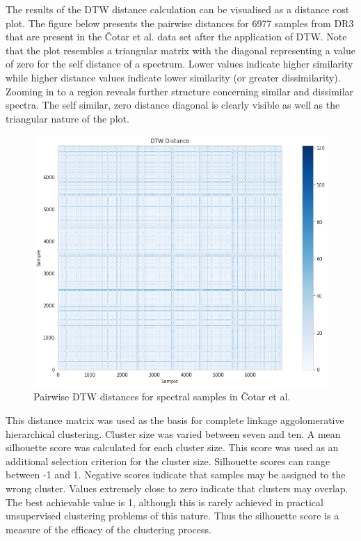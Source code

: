 The results of the DTW distance calculation can be visualised as a distance cost plot. The figure below presents the pairwise distances for 6977 samples from DR3 that are present in the Čotar et al. data set after the application of DTW. Note that the plot resembles a triangular matrix with the diagonal representing a value of zero for the self distance of a spectrum. Lower values indicate higher similarity while higher distance values indicate lower similarity (or greater dissimilarity). Zooming in to a region reveals further structure concerning similar and dissimilar spectra. The self similar, zero distance diagonal is clearly visible as well as the triangular nature of the plot.

\begin{figure}[!htb]
\centering
\includegraphics[scale=0.60]{figures/dtw cotar.png}
\caption{Pairwise DTW distances for spectral samples in Čotar et al.}
\end{figure}

This distance matrix was used as the basis for complete linkage aggolomerative hierarchical clustering. Cluster size was varied between seven and ten. A mean silhouette score was calculated for each cluster size. This score was used as an additional selection criterion for the cluster size. Silhouette scores can range between -1 and 1. Negative scores indicate that samples may be assigned to the wrong cluster. Values extremely close to zero indicate that clusters may overlap. The best achievable value is 1, although this is rarely achieved in practical unsupervised clustering problems of this nature. Thus the silhouette score is a measure of the efficacy of the clustering process.

